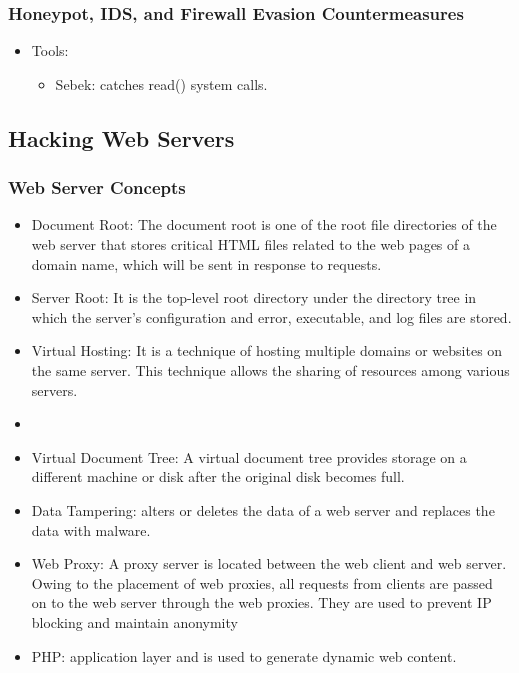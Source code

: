 \subsubsection{Honeypot, IDS, and Firewall Evasion Countermeasures}
\begin{itemize}
    \item Tools:
    \begin{itemize}
        \item Sebek: catches read() system calls.
    \end{itemize}
\end{itemize}

\subsection{Hacking Web Servers}
\subsubsection{Web Server Concepts}
\begin{itemize}
    \item Document Root: The document root is one of the root file directories of the web server that stores critical HTML files related to the web pages of a domain name, which will be sent in response to requests.
    \item Server Root: It is the top-level root directory under the directory tree in which the server's configuration and error, executable, and log files are stored.
    \item Virtual Hosting: It is a technique of hosting multiple domains or websites on the same server. This technique allows the sharing of resources among various servers.
    \item \item Virtual Document Tree: A virtual document tree provides storage on a different machine or disk after the original disk becomes full.
    \item Data Tampering: alters or deletes the data of a web server and replaces the data with malware.
    \item Web Proxy: A proxy server is located between the web client and web server. Owing to the placement of web proxies, all requests from clients are passed on to the web server through the web proxies. They are used to prevent IP blocking and maintain anonymity
    \item PHP: application layer and is used to generate dynamic web content.
\end{itemize}
